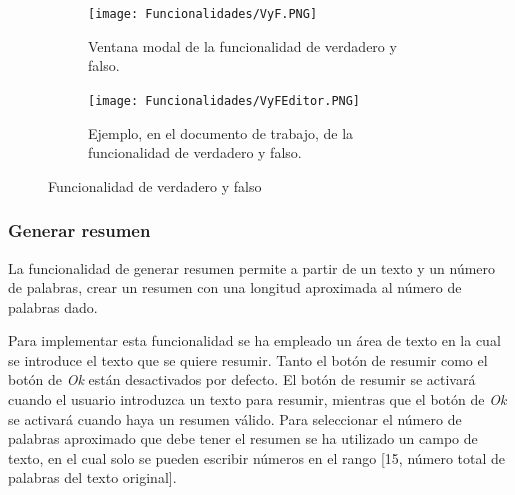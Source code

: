 \begin{figure}[ht!]
  \centering
  \begin{subfigure}{\textwidth}
    \centering
    \texttt{[image: Funcionalidades/VyF.PNG]}
    \caption{Ventana modal de la funcionalidad de verdadero y falso.}
    \label{fig:vyf}
  \end{subfigure}

  \begin{subfigure}{\textwidth}
    \centering
    \texttt{[image: Funcionalidades/VyFEditor.PNG]}
    \caption{Ejemplo, en el documento de trabajo, de la funcionalidad de verdadero y falso.}
    \label{fig:vyfEdit}
  \end{subfigure}

  \caption{Funcionalidad de verdadero y falso}
  \label{fig:veryfalso}
\end{figure}

\subsubsection{Generar resumen}
\label{sec:impresumen}
La funcionalidad de generar resumen permite a partir de un texto y un número de palabras, crear un resumen con una longitud aproximada al número de palabras dado.

Para implementar esta funcionalidad se ha empleado un área de texto en la cual se introduce el texto que se quiere resumir. Tanto el botón de resumir como el botón de \textit{Ok} están desactivados por defecto. El botón de resumir se activará cuando el usuario introduzca un texto para resumir, mientras que el botón de \textit{Ok} se activará cuando haya un resumen válido. Para seleccionar el número de palabras aproximado que debe tener el resumen se ha utilizado un campo de texto, en el cual solo se pueden escribir números en el rango [15, número total de palabras del texto original].

